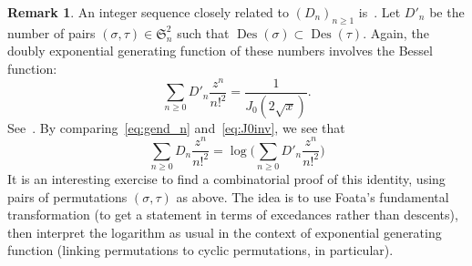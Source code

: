\documentclass[11pt]{article}
\theoremstyle{definition}
\newtheorem{rema}[theo]{Remark}
\DeclareMathOperator{\des}{Des}
\begin{document}
\begin{rema}
    An integer sequence closely related to $(D_n)_{n\geq 1}$ is~\cite[A000275]{oeis}.  Let $D'_n$ be the number of pairs $(\sigma,\tau) \in \mathfrak{S}_n^2$ such that $\des(\sigma) \subset \des(\tau)$. Again, the doubly exponential generating function of these numbers involves the Bessel function:
    \begin{equation} \label{eq:J0inv}
        \sum_{n \geq 0} D'_n \frac{z^n}{n!^2} = \frac{1}{J_0(2\sqrt{x})}.
    \end{equation}
    See~\cite{carlitz}.  By comparing~\eqref{eq:gend_n} and~\eqref{eq:J0inv}, we see that
    \[
        \sum_{n \geq 0} D_n \frac{z^n}{n!^2}
            =
        \log\bigg(\sum_{n \geq 0} D'_n \frac{z^n}{n!^2}\bigg)
    \]
    It is an interesting exercise to find a combinatorial proof of this identity, using pairs of permutations $(\sigma,\tau)$ as above.  The idea is to use Foata's fundamental transformation (to get a statement in terms of excedances rather than descents), then interpret the logarithm as usual in the context of exponential generating function (linking permutations to cyclic permutations, in particular).
\end{rema}
\end{document}
